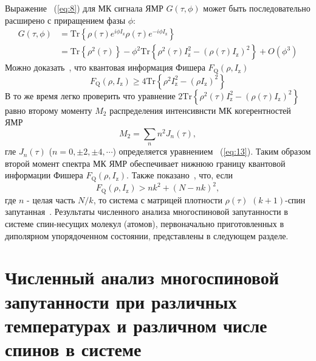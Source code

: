 \documentclass[utf8]{jetp}
\begin{document}
Выражение ~(\ref{eq:8}) для МК сигнала ЯМР $G(\tau,\phi)$ может быть последовательно расширено с приращением фазы $\phi$:
%
\begin{equation}
    \begin{split}
        \label{eq:17}
        G(\tau,\phi)  
        & = \mathrm{Tr} \left\{ 
            \rho(\tau) e^{i \phi I_\mathrm{z} }
            \rho(\tau) e^{-i\phi I_\mathrm{z}}
        \right\}  \\
        & = \mathrm{Tr} \left\{ \rho^2(\tau) \right\} 
        - \phi^2 \mathrm{Tr} \left\{ 
            \rho^2(\tau) I^2_\mathrm{z} 
            - (\rho(\tau) I_\mathrm{z})^2
        \right\} 
        + O(\phi^3)
    \end{split}
\end{equation}
%
Можно доказать~\cite{Girolami_2017}, что квантовая информация Фишера $F_\mathrm{Q}(\rho,I_\mathrm{z})$~\cite{Helstrom_1976}
%
\begin{equation}
    \label{eq:18}
    F_\mathrm{Q}(\rho,I_\mathrm{z}) \geq 4 \mathrm{Tr} \left\{ \rho^2 I^2_\mathrm{z} - (\rho I_\mathrm{z})^2 \right\}
\end{equation}
%
В то же время легко проверить что уравнение $2 \mathrm{Tr} \left\{ \rho^2(\tau) I_\mathrm{z}^2 - \left( \rho(\tau) I_\mathrm{z} \right)^2 \right\}$ равно второму моменту $M_2$ распределения интенсивнсти МК когерентностей ЯМР~\cite{Khitrin_1997}
%
\begin{equation}
    \label{eq:19}
    M_2 = \sum_{n} n^2 J_n (\tau) ,
\end{equation}
%
гле $J_n(\tau)$ ($n=0,\pm 2, \pm 4, \cdots$) определяется уравнением ~(\ref{eq:13}).
Таким образом второй момент спектра МК ЯМР обеспечивает нижнюю границу квантовой информации Фишера $F_\mathrm{Q}(\rho,I_\mathrm{z})$.
Также показано~\cite{T_th_2014,Pezz__2018}, что, если
%
\begin{equation}
    \label{eq:20}
    F_\mathrm{Q} (\rho,I_\mathrm{z}) > n k^2 + (N - n k)^2,
\end{equation}
%
где $n$ - целая часть ${N/k}$, то система с матрицей плотности $\rho(\tau)$ $(k+1)$-спин запутанная~\cite{Pezz__2009,Hyllus_2012,T_th_2012}.
Результаты численного анализа многоспиновой запутанности в системе спин-несущих молекул (атомов), первоначально приготовленных в диполярном упорядоченном состоянии, представлены в следующем разделе.



\section{Численный анализ многоспиновой запутанности при различных температурах и различном числе спинов в системе}
\label{sec:5}
\end{document}
